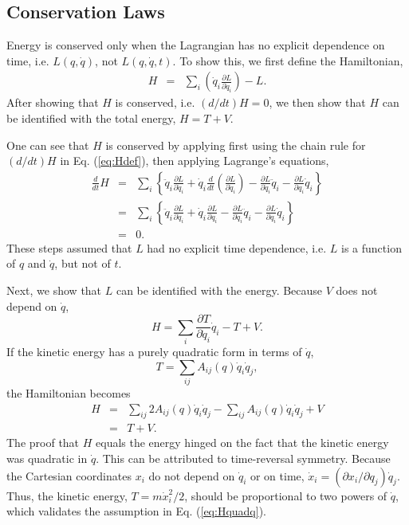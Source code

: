 \subsection{Conservation Laws}

Energy is conserved only when the Lagrangian has no explicit
dependence on time, i.e. $L(q,\dot{q})$, not $L(q,\dot{q},t)$. To show
this, we first define the Hamiltonian,
\begin{eqnarray}
\label{eq:Hdef}
H&=&\sum_i\left(\dot{q}_i\frac{\partial
  L}{\partial\dot{q}_i}\right)-L.
\end{eqnarray}
After showing that $H$ is conserved, i.e. $(d/dt)H=0$, we then show
that $H$ can be identified with the total energy, $H=T+V$.

One can see that $H$ is conserved by applying first using the chain
rule for $(d/dt)H$ in Eq. (\ref{eq:Hdef}), then applying Lagrange's
equations,
\begin{eqnarray}
\frac{d}{dt}H&=&\sum_i\left\{\ddot{q}_i\frac{\partial
  L}{\partial\dot{q}_i}+\dot{q}_i\frac{d}{dt}\left(\frac{\partial
  L}{\partial\dot{q}_i}\right)-\frac{\partial
  L}{\partial\dot{q}_i}\ddot{q}_i-\frac{\partial L}{\partial
  q_i}\dot{q}_i\right\}\\ \nonumber
&=&\sum_i\left\{\ddot{q}_i\frac{\partial
  L}{\partial\dot{q}_i}+\dot{q}_i\frac{\partial L}{\partial
  q_i}-\frac{\partial L}{\partial\dot{q}_i}\ddot{q}_i-\frac{\partial
  L}{\partial q_i}\dot{q}_i\right\}\\ \nonumber &=&0.
\end{eqnarray}
These steps assumed that $L$ had no explicit time dependence, i.e. $L$
is a function of $q$ and $\dot{q}$, but not of $t$.

Next, we show that $L$ can be identified with the energy. Because $V$
does not depend on $\dot{q}$,
\begin{equation}
H=\sum_i\frac{\partial T}{\partial\dot{q}_i}\dot{q}_i-T+V.
\end{equation}
If the kinetic energy has a purely quadratic form in terms of
$\dot{q}$,
\begin{equation}
\label{eq:Hquadq}
T=\sum_{ij}A_{ij}(q)\dot{q}_i\dot{q}_j,
\end{equation}
the Hamiltonian becomes
\begin{eqnarray}
H&=&\sum_{ij}2A_{ij}(q)\dot{q}_i\dot{q}_j-\sum_{ij}A_{ij}(q)\dot{q}_i\dot{q}_j+V\\ \nonumber
&=&T+V.
\end{eqnarray}
The proof that $H$ equals the energy hinged on the fact that the
kinetic energy was quadratic in $\dot{q}$. This can be attributed to
time-reversal symmetry. Because the Cartesian coordinates $x_i$ do not
depend on $\dot{q}_i$ or on time, $\dot{x}_i=(\partial x_i/\partial
q_j)\dot{q}_j$. Thus, the kinetic energy, $T=m\dot{x}_i^2/2$, should
be proportional to two powers of $\dot{q}$, which validates the
assumption in Eq. (\ref{eq:Hquadq}).

